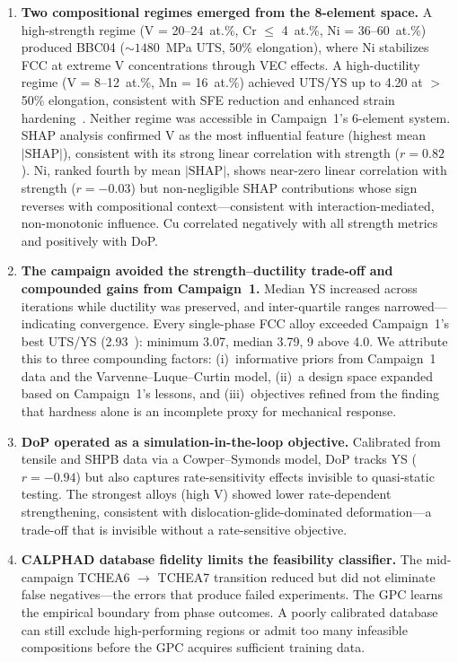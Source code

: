 \documentclass[preprint,12pt,times]{elsarticle}  %
\begin{document}
\begin{enumerate}
\item \textbf{Two compositional regimes emerged from the 8-element space.} A high-strength regime (V = 20--24~at.\%, Cr $\leq$ 4~at.\%, Ni = 36--60~at.\%) produced BBC04 (${\sim}1480$~MPa UTS, 50\% elongation), where Ni stabilizes FCC at extreme V concentrations through VEC effects. A high-ductility regime (V = 8--12~at.\%, Mn = 16~at.\%) achieved UTS/YS up to 4.20 at $>$50\% elongation, consistent with SFE reduction and enhanced strain hardening~\cite{li2016metastable, otto2013influences}. Neither regime was accessible in Campaign~1's 6-element system. SHAP analysis confirmed V as the most influential feature (highest mean $|\text{SHAP}|$), consistent with its strong linear correlation with strength ($r = 0.82$). Ni, ranked fourth by mean $|\text{SHAP}|$, shows near-zero linear correlation with strength ($r = -0.03$) but non-negligible SHAP contributions whose sign reverses with compositional context---consistent with interaction-mediated, non-monotonic influence. Cu correlated negatively with all strength metrics and positively with DoP.

\item \textbf{The campaign avoided the strength--ductility trade-off and compounded gains from Campaign~1.} Median YS increased across iterations while ductility was preserved, and inter-quartile ranges narrowed---indicating convergence. Every single-phase FCC alloy exceeded Campaign~1's best UTS/YS (2.93~\cite{hastings2025accelerated}): minimum 3.07, median 3.79, 9 above 4.0. We attribute this to three compounding factors: (i)~informative priors from Campaign~1 data and the Varvenne--Luque--Curtin model, (ii)~a design space expanded based on Campaign~1's lessons, and (iii)~objectives refined from the finding that hardness alone is an incomplete proxy for mechanical response.

\item \textbf{DoP operated as a simulation-in-the-loop objective.} Calibrated from tensile and SHPB data via a Cowper--Symonds model, DoP tracks YS ($r = -0.94$) but also captures rate-sensitivity effects invisible to quasi-static testing. The strongest alloys (high V) showed lower rate-dependent strengthening, consistent with dislocation-glide-dominated deformation---a trade-off that is invisible without a rate-sensitive objective.

\item \textbf{CALPHAD database fidelity limits the feasibility classifier.} The mid-campaign TCHEA6 $\rightarrow$ TCHEA7 transition reduced but did not eliminate false negatives---the errors that produce failed experiments. The GPC learns the empirical boundary from phase outcomes. A poorly calibrated database can still exclude high-performing regions or admit too many infeasible compositions before the GPC acquires sufficient training data.

\end{enumerate}
\end{document}
